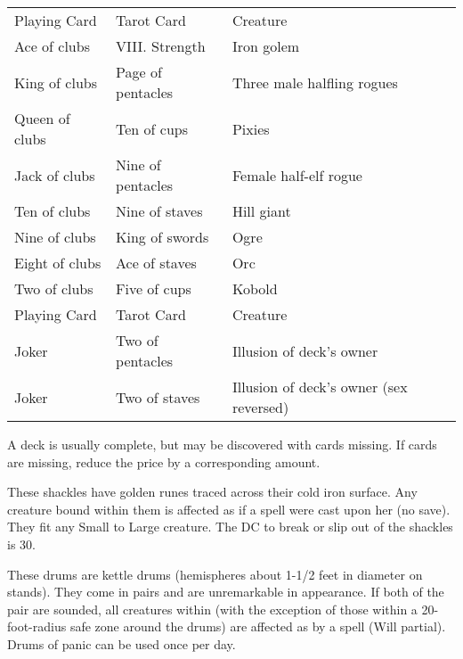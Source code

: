 {\begin{dtable}
\begin{tabularx}{\columnwidth}{l l >{\lcol}X}
Playing Card & Tarot Card & Creature \\
Ace of clubs & VIII. Strength & Iron golem \\
King of clubs & Page of pentacles & Three male halfling rogues \\
Queen of clubs & Ten of cups & Pixies \\
Jack of clubs & Nine of pentacles & Female half-elf rogue \\
Ten of clubs & Nine of staves & Hill giant \\
Nine of clubs & King of swords & Ogre \\
Eight of clubs & Ace of staves & Orc \\
Two of clubs & Five of cups & Kobold \\
Playing Card & Tarot Card & Creature \\
Joker & Two of pentacles & Illusion of deck's owner \\
Joker & Two of staves & Illusion of deck's owner (sex reversed)
\end{tabularx}
\end{dtable}

A deck is usually complete, but may be discovered with cards missing. If cards are missing, reduce the price by a corresponding amount.


 These shackles have golden runes traced across their cold iron surface. Any creature bound within them is affected as if a  spell were cast upon her (no save). They fit any Small to Large creature. The DC to break or slip out of the shackles is 30.


 These drums are kettle drums (hemispheres about 1-1/2 feet in diameter on stands). They come in pairs and are unremarkable in appearance. If both of the pair are sounded, all creatures within  (with the exception of those within a 20-foot-radius safe zone around the drums) are affected as by a  spell (Will partial). Drums of panic can be used once per day.


}
